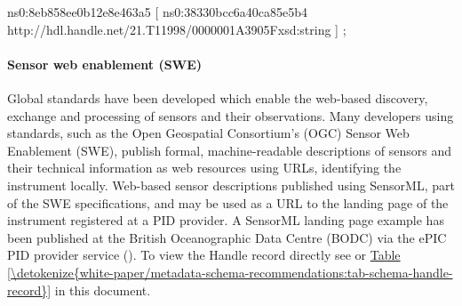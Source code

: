 \documentclass[a4paper,10pt,english]{sphinxmanual}
\begin{document}
\begin{sphinxVerbatim}[commandchars=\\\{\}]
    ns0:8eb858ee0b12e8e463a5 [ ns0:38330bcc6a40ca85e5b4 \PYGZdq{}http://hdl.handle.net/21.T11998/0000\PYGZhy{}001A\PYGZhy{}3905\PYGZhy{}F\PYGZdq{}\PYGZca{}\PYGZca{}xsd:string ] ;
\end{sphinxVerbatim}


\paragraph{Sensor web enablement (SWE)}
\label{\detokenize{white-paper/landing-page-encoding:sensor-web-enablement-swe}}\label{\detokenize{white-paper/landing-page-encoding:landing-page-encoding-swe}}
Global standards have been developed which enable the web-based
discovery, exchange and processing of sensors and their observations.
Many developers using standards, such as the Open Geospatial
Consortium’s (OGC) Sensor Web Enablement (SWE), publish formal,
machine-readable descriptions of sensors and their technical information
as web resources using URLs, identifying the instrument locally.
Web-based sensor descriptions published using SensorML, part of the SWE
specifications, and may be used as a URL to the landing page of the
instrument registered at a PID provider. A SensorML landing page example
has been published at the British Oceanographic Data Centre (BODC) via
the ePIC PID provider service
(). To view the Handle
record directly see
 or
\hyperref[\detokenize{white-paper/metadata-schema-recommendations:tab-schema-handle-record}]{Table \ref{\detokenize{white-paper/metadata-schema-recommendations:tab-schema-handle-record}}} in this document.
\end{document}
